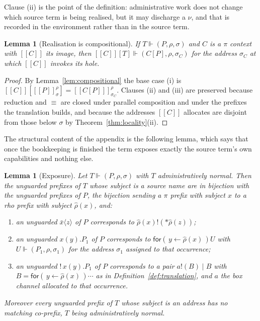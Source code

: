 \documentclass[11pt]{article}
\theoremstyle{definition}
\theoremstyle{plain}
\newtheorem{lemma}[definition]{Lemma}
\theoremstyle{remark}
\newcommand{\drp}[1]{{*}#1}
\newcommand{\inp}[3]{\mathsf{for}(\,#1 \leftarrow #2\,)#3}
\newcommand{\out}[2]{#1!(#2)}
\newcommand{\enc}[1]{[\![#1]\!]}
\newcommand{\real}{\Vdash}
\begin{document}
Clause (ii) is the point of the definition: administrative work does not
change which source term is being realised, but it may discharge a $\nu$,
and that is recorded in the environment rather than in the source term.

\begin{lemma}[Realisation is compositional]\label{lem:real-comp}
If $T \real (P,\rho,\sigma)$ and $C$ is a $\pi$ context with
$\enc{C}$ its image, then $\enc{C}[T] \real (C[P],\rho,\sigma_C)$ for the
address $\sigma_C$ at which $\enc{C}$ invokes its hole.
\end{lemma}

\begin{proof}
By Lemma~\ref{lem:compositional} the base case (i) is
$\enc{C}[\enc{P}^\rho_\sigma] = \enc{C[P]}^\rho_{\sigma_C}$. Clauses (ii)
and (iii) are preserved because reduction and $\equiv$ are closed under
parallel composition and under the prefixes the translation builds, and
because the addresses $\enc{C}$ allocates are disjoint from those below
$\sigma$ by Theorem~\ref{thm:locality}(ii).
\end{proof}

The structural content of the appendix is the following lemma, which says
that once the bookkeeping is finished the term exposes exactly the source
term's own capabilities and nothing else.

\begin{lemma}[Exposure]\label{lem:exposure}
Let $T \real (P,\rho,\sigma)$ with $T$ administratively normal. Then
the unguarded prefixes of $T$ whose subject is a source name are in
bijection with the unguarded prefixes of $P$, the bijection sending a
$\pi$ prefix with subject $x$ to a rho prefix with subject $\hat\rho(x)$,
and:
\begin{enumerate}[label=(\roman*),leftmargin=2.2em,nosep]
\item an unguarded $\bar x\langle z\rangle$ of $P$ corresponds to
$\out{\hat\rho(x)}{\drp{\hat\rho(z)}}$;
\item an unguarded $x(y).P_1$ of $P$ corresponds to
$\inp{y}{\hat\rho(x)}{U}$ with $U \real (P_1,\rho,\sigma_1)$ for the
address $\sigma_1$ assigned to that occurrence;
\item an unguarded $!\,x(y).P_1$ of $P$ corresponds to a pair
$\out{a}{B} \mid B$ with $B = \inp{y}{\hat\rho(x)}{\cdots}$ as in
Definition~\ref{def:translation}, and $a$ the box channel allocated to
that occurrence.
\end{enumerate}
Moreover every unguarded prefix of $T$ whose subject is an address has no
matching co-prefix, $T$ being administratively normal.
\end{lemma}
\end{document}

